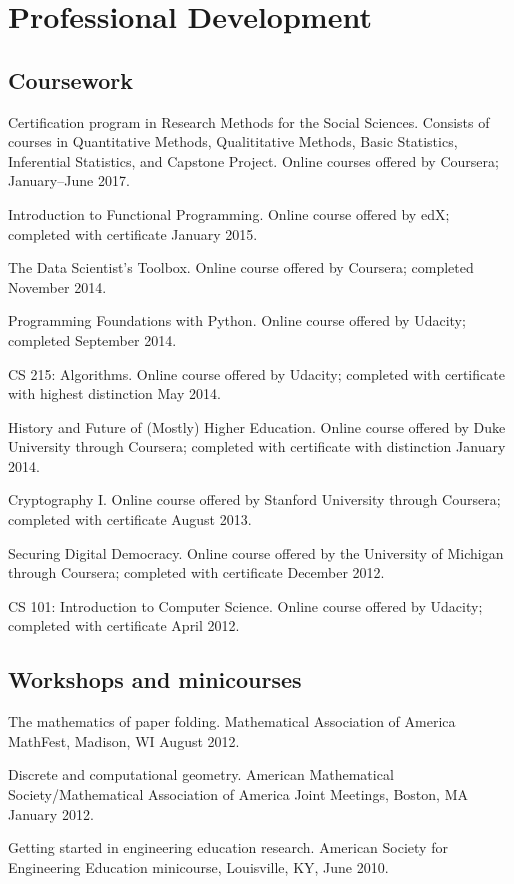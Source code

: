 \documentclass[letterpaper]{article}
\renewenvironment{itemize}{
  \begin{list}{}{
    \setlength{\leftmargin}{1.5em}
	\setlength{\itemsep}{0in}
  }
}{
  \end{list}
}
\begin{document}
\section*{Professional Development}

\subsection*{Coursework}
\begin{itemize}
  \item Certification program in Research Methods for the Social Sciences. Consists of courses in Quantitative Methods, Qualititative Methods, Basic Statistics, Inferential Statistics, and Capstone Project. Online courses offered by Coursera; January--June 2017.
	\item Introduction to Functional Programming. Online course offered by edX; completed with certificate January 2015.
	\item The Data Scientist's Toolbox. Online course offered by Coursera; completed November 2014.
	\item Programming Foundations with Python. Online course offered by Udacity; completed September 2014.
	\item CS 215: Algorithms. Online course offered by Udacity; completed with certificate with highest distinction May 2014.
	\item History and Future of (Mostly) Higher Education. Online course offered by Duke University through Coursera; completed with certificate with distinction January 2014.
	\item Cryptography I. Online course offered by Stanford University through Coursera; completed with certificate August 2013.
	\item Securing Digital Democracy. Online course offered by the University of Michigan through Coursera; completed with certificate December 2012.
	\item CS 101: Introduction to Computer Science. Online course offered by Udacity; completed with certificate April 2012.
\end{itemize}


\subsection*{Workshops and minicourses}

\begin{itemize}
	\item The mathematics of paper folding. Mathematical Association of America MathFest, Madison, WI August 2012.
	\item Discrete and computational geometry. American Mathematical Society/Mathematical Association of America Joint Meetings, Boston, MA January 2012.
	\item Getting started in engineering education research. American Society for Engineering Education minicourse, Louisville, KY, June 2010.
\end{itemize}
\end{document}
